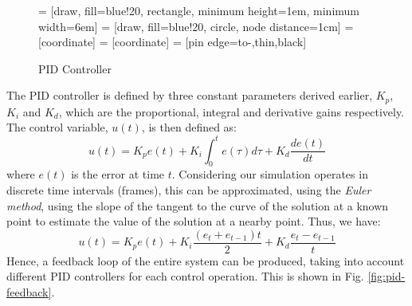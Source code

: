\documentclass[12pt]{article}
\begin{document}
\begin{figure}[ht]
    \centering
     = [draw, fill=blue!20, rectangle, 
    minimum height=1em, minimum width=6em]
     = [draw, fill=blue!20, circle, node distance=1cm]
     = [coordinate]
     = [coordinate]
     = [pin edge={to-,thin,black}]

    \caption{PID Controller}
    \label{fig:pid}
\end{figure}

The PID controller is defined by three constant parameters derived earlier, $K_p$, $K_i$ and $K_d$, which are the proportional, integral and derivative gains respectively. The control variable, $u(t)$, is then defined as:
\begin{equation}
    u(t) = K_p e(t) + K_i \int_0^t e(\tau) d\tau + K_d \frac{de(t)}{dt}
\end{equation}
where $e(t)$ is the error at time $t$. Considering our simulation operates in discrete time intervals (frames), this can be approximated, using the \emph{Euler method}, using the slope of the tangent to the curve of the solution at a known point to estimate the value of the solution at a nearby point. Thus, we have:
\begin{equation}
    u(t) = K_p e(t) + K_i \frac{(e_t+e_{t-1})t}{2} + K_d \frac{e_t-e_{t-1}}{t}
\end{equation}
Hence, a feedback loop of the entire system can be produced, taking into account different PID controllers for each control operation. This is shown in Fig. \ref{fig:pid-feedback}.
\end{document}
